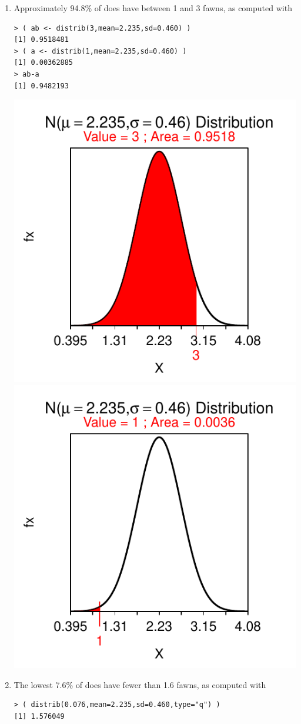 \documentclass[10pt,openany]{book}\usepackage[]{graphicx}\usepackage[]{color}
\makeatletter
\newenvironment{kframe}{%
 \def\at@end@of@kframe{}%
 \ifinner\ifhmode%
  \def\at@end@of@kframe{\end{minipage}}%
  \begin{minipage}{\columnwidth}%
 \fi\fi%
 \def\FrameCommand##1{\hskip\@totalleftmargin \hskip-\fboxsep
 \colorbox{shadecolor}{##1}\hskip-\fboxsep
     \hskip-\linewidth \hskip-\@totalleftmargin \hskip\columnwidth}%
 \MakeFramed {\advance\hsize-\width
   \@totalleftmargin\z@ \linewidth\hsize
   \@setminipage}}%
 {\par\unskip\endMakeFramed%
 \at@end@of@kframe}
\newenvironment{knitrout}{}{} %
\makeatother
\begin{document}
\begin{itemize}
\begin{enumerate}
\begin{knitrout}
{}



\end{knitrout}
      \item Approximately 94.8\% of does have between 1 and 3 fawns, as computed with
\begin{knitrout}
\color{fgcolor}\begin{kframe}
\begin{verbatim}
> ( ab <- distrib(3,mean=2.235,sd=0.460) )
[1] 0.9518481
> ( a <- distrib(1,mean=2.235,sd=0.460) )
[1] 0.00362885
> ab-a
[1] 0.9482193
\end{verbatim}
\end{kframe}

{\centering \includegraphics[width=.4\linewidth]{Figs/unnamed-chunk-239-1} 
\includegraphics[width=.4\linewidth]{Figs/unnamed-chunk-239-2} 

}



\end{knitrout}
      \item The lowest 7.6\% of does have fewer than 1.6 fawns, as computed with
\begin{knitrout}
\color{fgcolor}\begin{kframe}
\begin{verbatim}
> ( distrib(0.076,mean=2.235,sd=0.460,type="q") )
[1] 1.576049
\end{verbatim}
\end{kframe}


\end{knitrout}
\end{enumerate}
\end{itemize}
\end{document}
